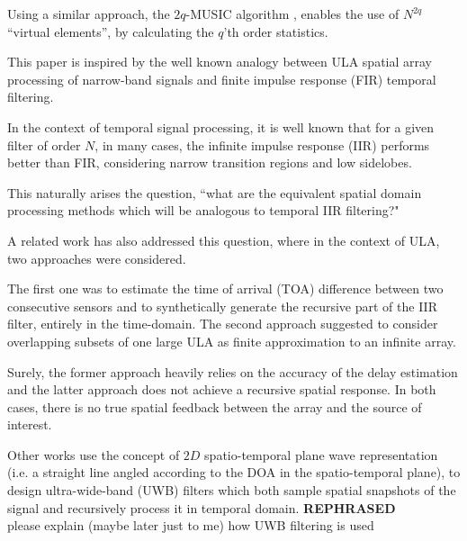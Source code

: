 \par Using a similar approach, the $2q$-MUSIC algorithm \cite{Chevalier2006High-resolutionAlgorithm}, enables the use of $N^{2q}$ ``virtual elements'', by calculating the $q$'th order statistics.
\par This paper is inspired by the well known \cite{VanVeenBeamforming:Filtering} analogy between ULA spatial array processing of narrow-band signals and finite impulse response (FIR) temporal filtering. 
\par In the context of temporal signal processing, it is well known that for a given filter of order $N$, in many cases, the infinite impulse response (IIR) performs better than FIR, considering narrow transition regions and low sidelobes.
\par This naturally arises the question, ``what are the equivalent spatial domain processing methods which will be analogous to temporal IIR filtering?" 
\par A related work \cite{Wen2013ExtendingStructure} has also addressed this question, where in the context of ULA, two approaches were considered.
\par The first one was to estimate the time of arrival (TOA) difference between two consecutive sensors and to synthetically generate the recursive part of the IIR filter, entirely in the time-domain. The second approach suggested to consider overlapping subsets of one large ULA as finite approximation to an infinite array. 
\par Surely, the former approach heavily relies on the accuracy of the delay estimation and the latter approach does not achieve a recursive spatial response. In both cases, there is no true spatial feedback between the array and the source of interest.
\par Other works \cite{Madanayake2008AFilters,Madanayake2008ABeamformer} use the concept of $2D$ spatio-temporal plane wave representation (i.e. a straight line angled according to the DOA in the spatio-temporal plane), to design ultra-wide-band (UWB) filters \cite{L.Bruton1983HighlyPlanes} which both sample spatial snapshots of the signal and recursively process it in temporal domain.  {\textbf{REPHRASED}\\please explain (maybe later just to me) how UWB filtering is used}
